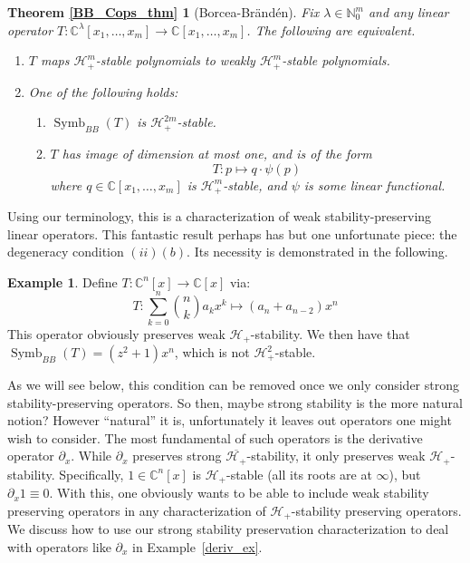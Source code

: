 \documentclass{article}
\theoremstyle{definition}
\newtheorem{example}[theorem]{Example}
\theoremstyle{plain}
\newcommand{\C}{\mathbb{C}}
\newcommand{\N}{\mathbb{N}}
\newcommand{\UHP}{\mathcal{H}_+}
\DeclareMathOperator{\Symb}{Symb}
\begin{document}
\newtheorem*{BB_Cops_thm}{Theorem \ref{BB_Cops_thm}}
\begin{BB_Cops_thm}[Borcea-Br{\"a}nd{\'e}n]
    Fix $\lambda \in \N_0^m$ and any linear operator $T: \C^\lambda[x_1,\ldots,x_m] \to \C[x_1,\ldots,x_m]$. The following are equivalent.
    \begin{enumerate}[label=(\roman*)]
        \item $T$ maps $\UHP^m$-stable polynomials to weakly $\UHP^m$-stable polynomials.
        \item One of the following holds:
            \begin{enumerate}[label=(\alph*)]
                \item $\Symb_{BB}(T)$ is $\UHP^{2m}$-stable.
                \item $T$ has image of dimension at most one, and is of the form
                \[
                    T: p \mapsto q \cdot \psi(p)
                \]
                where $q \in \C[x_1,\ldots,x_m]$ is $\UHP^m$-stable, and $\psi$ is some linear functional.
            \end{enumerate}
    \end{enumerate}
\end{BB_Cops_thm}

Using our terminology, this is a characterization of weak stability-preserving linear operators. This fantastic result perhaps has but one unfortunate piece: the degeneracy condition $(ii)(b)$. Its necessity is demonstrated in the following.

\begin{example}
    Define $T: \C^n[x] \to \C[x]$ via:
    \[
        T: \sum_{k=0}^n \binom{n}{k} a_k x^k \mapsto (a_n + a_{n-2}) x^n
    \]
    This operator obviously preserves weak $\UHP$-stability. We then have that $\Symb_{BB}(T) = (z^2 + 1)x^n$, which is not $\UHP^2$-stable.
\end{example}

As we will see below, this condition can be removed once we only consider strong stability-preserving operators. So then, maybe strong stability is the more natural notion? However ``natural'' it is, unfortunately it leaves out operators one might wish to consider. The most fundamental of such operators is the derivative operator $\partial_x$. While $\partial_x$ preserves strong $\overline{\UHP}$-stability, it only preserves weak $\UHP$-stability. Specifically, $1 \in \C^n[x]$ is $\UHP$-stable (all its roots are at $\infty$), but $\partial_x 1 \equiv 0$. With this, one obviously wants to be able to include weak stability preserving operators in any characterization of $\UHP$-stability preserving operators. We discuss how to use our strong stability preservation characterization to deal with operators like $\partial_x$ in Example~\ref{deriv_ex}.
\end{document}
